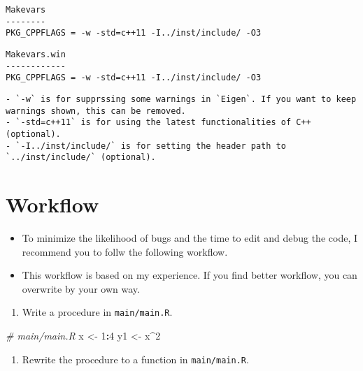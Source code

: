 \documentclass[
]{book}
\newenvironment{Shaded}{\begin{snugshade}}{\end{snugshade}}
\newcommand{\CommentTok}[1]{\textcolor[rgb]{0.56,0.35,0.01}{\textit{#1}}}
\newcommand{\DecValTok}[1]{\textcolor[rgb]{0.00,0.00,0.81}{#1}}
\newcommand{\NormalTok}[1]{#1}
\newcommand{\OtherTok}[1]{\textcolor[rgb]{0.56,0.35,0.01}{#1}}
\newcommand{\SpecialCharTok}[1]{\textcolor[rgb]{0.81,0.36,0.00}{\textbf{#1}}}
\providecommand{\tightlist}{%
  \setlength{\itemsep}{0pt}\setlength{\parskip}{0pt}}
\begin{document}
\begin{verbatim}
Makevars
--------
PKG_CPPFLAGS = -w -std=c++11 -I../inst/include/ -O3
\end{verbatim}

\begin{verbatim}
Makevars.win
------------
PKG_CPPFLAGS = -w -std=c++11 -I../inst/include/ -O3
\end{verbatim}

\begin{verbatim}
- `-w` is for supprssing some warnings in `Eigen`. If you want to keep warnings shown, this can be removed.
- `-std=c++11` is for using the latest functionalities of C++ (optional).
- `-I../inst/include/` is for setting the header path to `../inst/include/` (optional).
\end{verbatim}

\hypertarget{workflow}{%
\section{Workflow}\label{workflow}}

\begin{itemize}
\tightlist
\item
  To minimize the likelihood of bugs and the time to edit and debug the code, I recommend you to follw the following workflow.
\item
  This workflow is based on my experience. If you find better workflow, you can overwrite by your own way.
\end{itemize}

\begin{enumerate}
\def\labelenumi{\arabic{enumi}.}
\tightlist
\item
  Write a procedure in \texttt{main/main.R}.
\end{enumerate}

\begin{Shaded}
\begin{Highlighting}[]
\CommentTok{\# main/main.R}
\NormalTok{x }\OtherTok{\textless{}{-}} \DecValTok{1}\SpecialCharTok{:}\DecValTok{4}
\NormalTok{y1 }\OtherTok{\textless{}{-}}\NormalTok{ x}\SpecialCharTok{\^{}}\DecValTok{2}
\end{Highlighting}
\end{Shaded}

\begin{enumerate}
\def\labelenumi{\arabic{enumi}.}
\setcounter{enumi}{1}
\tightlist
\item
  Rewrite the procedure to a function in \texttt{main/main.R}.
\end{enumerate}
\end{document}
